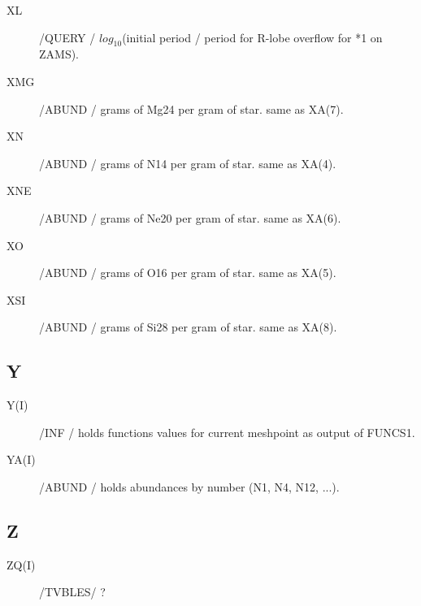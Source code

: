 \documentclass{article}
\begin{document}
\begin{description}
	\item[XL]		    /QUERY / $log_{10}$(initial period / period for R-lobe overflow for *1 on ZAMS).

	\item[XMG]		    /ABUND / grams of Mg24 per gram of star. same as XA(7).

	\item[XN]		    /ABUND / grams of N14 per gram of star. same as XA(4).

	\item[XNE	]	    /ABUND / grams of Ne20 per gram of star. same as XA(6).

	\item[XO]		    /ABUND / grams of O16 per gram of star. same as XA(5).

	\item[XSI]		    /ABUND / grams of Si28 per gram of star. same as XA(8).

\end{description}
\subsection*{Y}
\begin{description}
    \item[Y(I)]      	/INF   / holds functions values for current meshpoint as output of FUNCS1.

	\item[YA(I)]		/ABUND / holds abundances by number (N1, N4, N12, ...).
	
\end{description}
\subsection*{Z}
\begin{description}

   \item[ ZQ(I)]      	/TVBLES/ ?
   
\end{description}
\end{document}
